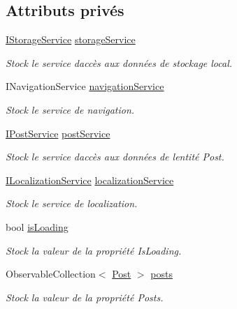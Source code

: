 \subsection*{Attributs privés}
\begin{DoxyCompactItemize}
\item 
\hyperlink{interface_boxes_1_1_services_1_1_storage_1_1_i_storage_service}{I\+Storage\+Service} \hyperlink{class_boxes_1_1_view_models_1_1_home_view_model_a3bd6b9be9afed71066aeb39291b2aaa4}{storage\+Service}
\begin{DoxyCompactList}\small\item\em Stock le service d\textquotesingle{}accès aux données de stockage local. \end{DoxyCompactList}\item 
I\+Navigation\+Service \hyperlink{class_boxes_1_1_view_models_1_1_home_view_model_ae5517d2f2f0bf741514a370425c99fcb}{navigation\+Service}
\begin{DoxyCompactList}\small\item\em Stock le service de navigation. \end{DoxyCompactList}\item 
\hyperlink{interface_boxes_1_1_services_1_1_post_1_1_i_post_service}{I\+Post\+Service} \hyperlink{class_boxes_1_1_view_models_1_1_home_view_model_adeb2bc8d9cb82fee7f93583f5901ba79}{post\+Service}
\begin{DoxyCompactList}\small\item\em Stock le service d\textquotesingle{}accès aux données de l\textquotesingle{}entité Post. \end{DoxyCompactList}\item 
\hyperlink{interface_boxes_1_1_services_1_1_localization_1_1_i_localization_service}{I\+Localization\+Service} \hyperlink{class_boxes_1_1_view_models_1_1_home_view_model_a929f17c774ad92cff26b39e3f35812c6}{localization\+Service}
\begin{DoxyCompactList}\small\item\em Stock le service de localization. \end{DoxyCompactList}\item 
bool \hyperlink{class_boxes_1_1_view_models_1_1_home_view_model_a208d887882ff10486fdcabafe8491e7d}{is\+Loading}
\begin{DoxyCompactList}\small\item\em Stock la valeur de la propriété {\ttfamily Is\+Loading}. \end{DoxyCompactList}\item 
Observable\+Collection$<$ \hyperlink{class_boxes_1_1_models_1_1_post}{Post} $>$ \hyperlink{class_boxes_1_1_view_models_1_1_home_view_model_a5bdecd39df858e8a9b57d5d3f6210a44}{posts}
\begin{DoxyCompactList}\small\item\em Stock la valeur de la propriété {\ttfamily Posts}. \end{DoxyCompactList}\end{DoxyCompactItemize}


